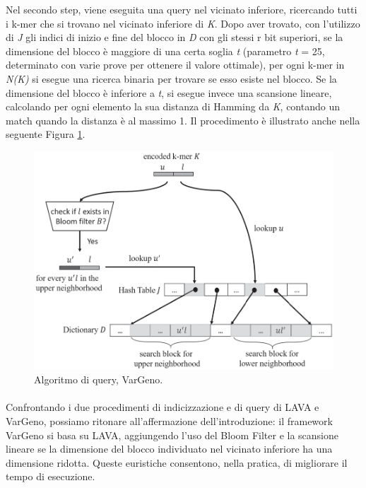\documentclass[../main.tex]{subfiles}
\begin{document}
Nel secondo step, viene eseguita una query nel vicinato inferiore, ricercando tutti i k-mer che si trovano nel vicinato inferiore di \textit{K}. Dopo aver trovato, con l'utilizzo di \textit{J} gli indici di inizio e fine del blocco in \textit{D} con gli stessi r bit superiori, se la dimensione del blocco è maggiore di una certa soglia \textit{t} (parametro \textit{t} = 25, determinato con varie prove per ottenere il valore ottimale), per ogni k-mer in \textit{N(K)} si esegue una ricerca binaria per trovare se esso esiste nel blocco. Se la dimensione del blocco è inferiore a \textit{t}, si esegue invece una scansione lineare, calcolando per ogni elemento la sua distanza di Hamming da \textit{K}, contando un match quando la distanza è al massimo 1. Il procedimento è illustrato anche nella seguente Figura \ref{fig:vargeno}.

\begin{figure}[h!]
	\centering
  	\captionsetup{justification=centering}
  	\includegraphics[scale=.40]{images/vargeno-query.png}
  	\caption{Algoritmo di query, VarGeno.}
  	\label{fig:vargeno}
\end{figure}

\paragraph{}
Confrontando i due procedimenti di indicizzazione e di query di LAVA e VarGeno, possiamo ritonare all'affermazione dell’introduzione: il framework VarGeno si basa su LAVA, aggiungendo l’uso del Bloom Filter e la scansione lineare se la dimensione del blocco individuato nel vicinato inferiore ha una dimensione ridotta. Queste euristiche consentono, nella pratica, di migliorare il tempo di esecuzione.
\end{document}
